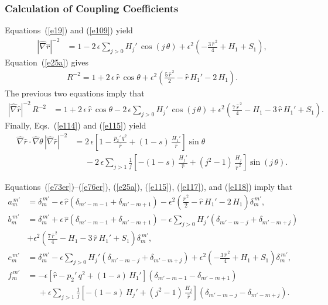 \documentclass[12pt,prb,aps]{revtex4-1}
\begin{document}
\subsubsection{Calculation of Coupling Coefficients}
Equations~(\ref{e19}) and (\ref{e109}) yield 
\begin{align}\label{e115}
|\hat{\nabla}\hat{r}|^{-2} &= 1 - 2\,\epsilon\sum_{j>0}H_j'\,\cos(j\,\theta)  
+ \epsilon^2\left(-\frac{3\,\hat{r}^{\,2}}{4} + H_1 + S_1\right),
\end{align}
Equation~(\ref{e25a}) gives
\begin{align}
R^{-2}= 1 + 2\,\epsilon\,\hat{r}\,\cos\theta +\epsilon^2\left(\frac{5\,\hat{r}^{\,2}}{2} - \hat{r}\,H_1'-2\,H_1\right).
\end{align}
The previous two equations imply that
\begin{align}\label{e117}
|\hat{\nabla}\hat{r}|^{-2} \,R^{-2}&= 1 +2\,\epsilon\,\hat{r}\,\cos\theta -2\,\epsilon \sum_{j>0}H_j'\,\cos(j\,\theta) + \epsilon^2\left(\frac{7\,\hat{r}^{\,2}}{4} - H_1 -3\,\hat{r}\,H_1' + S_1\right).
\end{align}
Finally, Eqs.~(\ref{e114}) and (\ref{e115}) yield
\begin{align}\label{e118}
\hat{\nabla}\hat{r}\cdot\hat{\nabla}\theta \,|\hat{\nabla}\hat{r}|^{-2} &= 2\,\epsilon\left[1-\frac{p_2'\,q^2}{\hat{r}} +(1-s)\,\frac{H_1'}{\hat{r}}\right]\sin\theta\nonumber\\[0.5ex]
&\phantom{=}-2\,\epsilon\sum_{j>1}\frac{1}{j}\left[-(1-s)\,\frac{H_j'}{\hat{r}} + (j^2-1)\,\frac{H_j}{\hat{r}^{\,2}}\right]\sin(j\,\theta).
\end{align}

Equations~(\ref{e73er})--(\ref{e76er}), (\ref{e25a}), (\ref{e115}), (\ref{e117}), and (\ref{e118}) imply that
\begin{align}\label{e120}
a_m^{\,m'} &= \delta_{m}^{\,m'} -\epsilon\,\hat{r}\left(\delta_{m'-m-1}+\delta_{m'-m+1}\right)-\epsilon^2\left(\frac{\hat{r}^{\,2}}{2}-\hat{r}\,H_1'-2\,H_1\right)\delta_m^{\,m'},\\[0.5ex]
b_m^{\,m'}&= \delta_m^{\,m'}+\epsilon\,\hat{r}\left(\delta_{m'-m-1}+\delta_{m'-m+1}\right)-\epsilon\sum_{j>0}H_j'\left(\delta_{m'-m-j}+\delta_{m'-m+j}\right)\nonumber\\[0.5ex]
&+ \epsilon^2\left(\frac{7\,\hat{r}^{\,2}}{4} - H_1 -3\,\hat{r}\,H_1' + S_1\right)\delta_{m}^{\,m'},\\[0.5ex]
c_m^{\,m'} &= \delta_m^{\,m'}-\epsilon\sum_{j>0}H_j'\left(\delta_{m'-m-j}+\delta_{m'-m+j}\right)+ \epsilon^2\left(-\frac{3\,\hat{r}^{\,2}}{4} + H_1 + S_1\right)\delta_{m}^{\,m'},\\[0.5ex]
f_m^{\,m'} &= -\epsilon\left[\hat{r} - p_2'\,q^2+ (1-s)\,H_1'\right]\left(\delta_{m'-m-1}-\delta_{m'-m+1}\right) \nonumber\\[0.5ex]
&\phantom{=}+ \epsilon\sum_{j>1}\frac{1}{j}\left[-(1-s)\,H_j'+(j^2-1)\,\frac{H_j}{\hat{r}}\right]\left(\delta_{m'-m-j}-\delta_{m'-m+j}\right).\label{e123}
\end{align}
\end{document}
